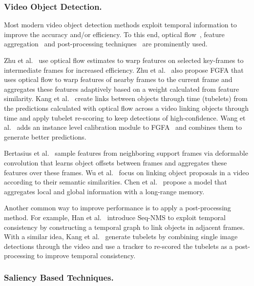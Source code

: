 \documentclass[runningheads]{llncs}
\begin{document}
\subsubsection{Video Object Detection.}


Most modern video object detection methods exploit temporal information to improve the accuracy and/or efficiency. To this end, optical flow~\cite{zhu2017dff,zhu2017fgfa,kang2017tubelets,wang2018manet}, feature aggregation~\cite{zhu2017fgfa,bertasius2018object,wu2019selsa,chen2020mega} and post-processing techniques~\cite{han2016seq,kang2016object} are prominently used. 


Zhu et al.~\cite{zhu2017dff} use optical flow estimates to warp features on selected key-frames to intermediate frames for increased efficiency. Zhu et al.~\cite{zhu2017fgfa} also propose FGFA that uses optical flow to warp features of nearby frames to the current frame and aggregates these features adaptively based on a weight calculated from feature similarity. Kang et al.~\cite{kang2017tubelets} create links between objects through time (tubelets) from the predictions calculated with optical flow across a video linking objects through time and apply tubelet re-scoring to keep detections of high-confidence. Wang et al.~\cite{wang2018manet} adds an instance level calibration module to FGFA~\cite{zhu2017fgfa} and combines them to generate better predictions. 


Bertasius et al.~\cite{bertasius2018object} sample features from neighboring support frames via deformable convolution that learns object offsets between frames and aggregates these features over these frames. Wu et al.~\cite{wu2019selsa} focus on linking object proposals in a video according to their semantic similarities. Chen et al.~\cite{chen2020mega} propose a model that aggregates local and global information with a long-range memory.


Another common way to improve performance is to apply a post-processing method. For example, Han et al.~\cite{han2016seq} introduce Seq-NMS to exploit temporal consistency by constructing a temporal graph to link objects in adjacent frames. With a similar idea, Kang et al.~\cite{kang2016object} generate tubelets by combining single image detections through the video and use a tracker to re-scored the tubelets as a post-processing to improve temporal consistency. 


\subsubsection{Saliency Based Techniques.}
\end{document}

